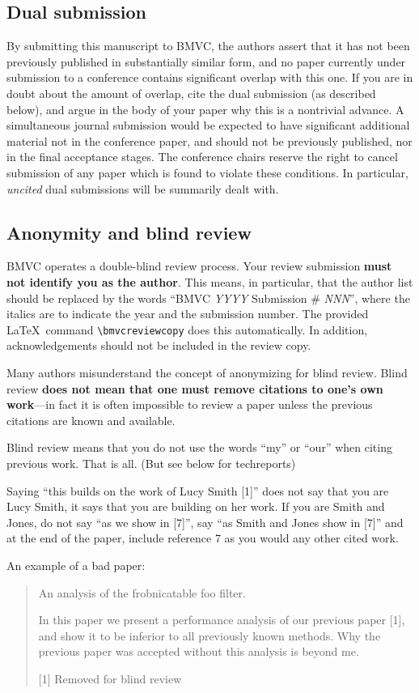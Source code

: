 \documentclass{bmvc2k}
\begin{document}
\subsection{Dual submission}
By submitting this manuscript to BMVC, the authors assert that it has not
been previously published in substantially similar form, and no paper
currently under submission to a conference contains significant overlap
with this one.  If you are in doubt about the amount of overlap, cite the
dual submission (as described below), and argue in the body of your paper
why this is a nontrivial advance.  A simultaneous journal submission would
be expected to have significant additional material not in the conference
paper, and should not be previously published, nor in the final acceptance
stages. The conference chairs reserve the right to cancel
submission of any paper which is found to violate these conditions.  In
particular, {\em uncited} dual submissions will be summarily dealt with.

\subsection{Anonymity and blind review}
BMVC operates a double-blind review process.  Your review submission {\bf
must not identify you as the author}.  This means, in particular, that the
author list should be replaced by the words ``BMVC {\em YYYY} Submission \#
{\em NNN}'', where the italics are to indicate the year and the submission
number.  The provided \LaTeX\ command \verb'\bmvcreviewcopy' does this
automatically.  In addition, acknowledgements should not be included in the
review copy.

Many authors misunderstand the concept of anonymizing for blind
review.  Blind review {\bf does not mean that one must remove
citations to one's own work}---in fact it is often impossible to
review a paper unless the previous citations are known and
available.

Blind review means that you do not use the words ``my'' or ``our''
when citing previous work.  That is all.  (But see below for
techreports)

Saying ``this builds on the work of Lucy Smith [1]'' does not say
that you are Lucy Smith, it says that you are building on her
work.  If you are Smith and Jones, do not say ``as we show in
[7]'', say ``as Smith and Jones show in [7]'' and at the end of the
paper, include reference 7 as you would any other cited work.

An example of a bad paper:
\begin{quote}
\begin{center}
    An analysis of the frobnicatable foo filter.
\end{center}

   In this paper we present a performance analysis of our
   previous paper [1], and show it to be inferior to all
   previously known methods.  Why the previous paper was
   accepted without this analysis is beyond me.

   [1] Removed for blind review
\end{quote}
\end{document}
